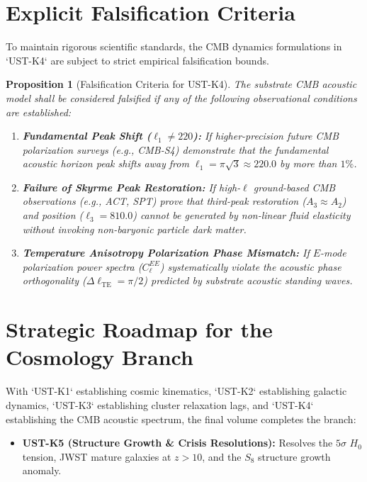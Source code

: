 \documentclass[11pt,a4paper]{article}
\newtheorem{prop}{Proposition}
\begin{document}
	\section{Explicit Falsification Criteria}
	\label{sec:falsification_tests}
	
	To maintain rigorous scientific standards, the CMB dynamics formulations in `UST-K4` are subject to strict empirical falsification bounds.
	
	\begin{prop}[Falsification Criteria for UST-K4]
		\label{prop:falsification_bounds_k4}
		The substrate CMB acoustic model shall be considered falsified if any of the following observational conditions are established:
		\begin{enumerate}
			\item \textbf{Fundamental Peak Shift ($\ell_1 \neq 220$):} If higher-precision future CMB polarization surveys (e.g., CMB-S4) demonstrate that the fundamental acoustic horizon peak shifts away from $\ell_1 = \pi\sqrt{3} \approx 220.0$ by more than $1\%$.
			\item \textbf{Failure of Skyrme Peak Restoration:} If high-$\ell$ ground-based CMB observations (e.g., ACT, SPT) prove that third-peak restoration ($A_3 \approx A_2$) and position ($\ell_3 = 810.0$) cannot be generated by non-linear fluid elasticity without invoking non-baryonic particle dark matter.
			\item \textbf{Temperature Anisotropy Polarization Phase Mismatch:} If $E$-mode polarization power spectra ($C_\ell^{EE}$) systematically violate the acoustic phase orthogonality ($\Delta \ell_{\text{TE}} = \pi / 2$) predicted by substrate acoustic standing waves.
		\end{enumerate}
	\end{prop}
	
	\section{Strategic Roadmap for the Cosmology Branch}
	\label{sec:cosmo_roadmap}
	
	With `UST-K1` \cite{USTK1} establishing cosmic kinematics, `UST-K2` \cite{USTK2} establishing galactic dynamics, `UST-K3` \cite{USTK3} establishing cluster relaxation lags, and `UST-K4` establishing the CMB acoustic spectrum, the final volume completes the branch:
	\begin{itemize}
		\item \textbf{UST-K5 (Structure Growth \& Crisis Resolutions):} Resolves the $5\sigma$ $H_0$ tension, JWST mature galaxies at $z > 10$, and the $S_8$ structure growth anomaly.
	\end{itemize}
	
\end{document}
